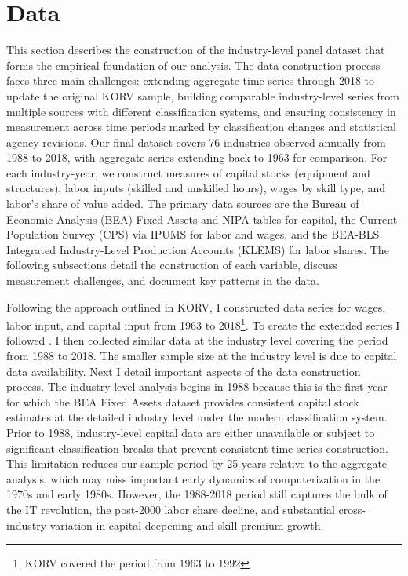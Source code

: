 \documentclass[12pt]{article}
\begin{document}
\section{Data}\label{sec:data}

This section describes the construction of the industry-level panel dataset that forms the empirical foundation of our analysis. The data construction process faces three main challenges: extending aggregate time series through 2018 to update the original KORV sample, building comparable industry-level series from multiple sources with different classification systems, and ensuring consistency in measurement across time periods marked by classification changes and statistical agency revisions. Our final dataset covers 76 industries observed annually from 1988 to 2018, with aggregate series extending back to 1963 for comparison. For each industry-year, we construct measures of capital stocks (equipment and structures), labor inputs (skilled and unskilled hours), wages by skill type, and labor's share of value added. The primary data sources are the Bureau of Economic Analysis (BEA) Fixed Assets and NIPA tables for capital, the Current Population Survey (CPS) via IPUMS for labor and wages, and the BEA-BLS Integrated Industry-Level Production Accounts (KLEMS) for labor shares. The following subsections detail the construction of each variable, discuss measurement challenges, and document key patterns in the data.

Following the approach outlined in KORV, I constructed data series for wages, labor input, and capital input from 1963 to 2018\footnote{KORV covered the period from 1963 to 1992}. To create the extended series I followed \citet{ohanian2021revisiting}. I then collected similar data at the industry level covering the period from 1988 to 2018. The smaller sample size at the industry level is due to capital data availability. Next I detail important aspects of the data construction process. The industry-level analysis begins in 1988 because this is the first year for which the BEA Fixed Assets dataset provides consistent capital stock estimates at the detailed industry level under the modern classification system. Prior to 1988, industry-level capital data are either unavailable or subject to significant classification breaks that prevent consistent time series construction. This limitation reduces our sample period by 25 years relative to the aggregate analysis, which may miss important early dynamics of computerization in the 1970s and early 1980s. However, the 1988-2018 period still captures the bulk of the IT revolution, the post-2000 labor share decline, and substantial cross-industry variation in capital deepening and skill premium growth.
\end{document}
